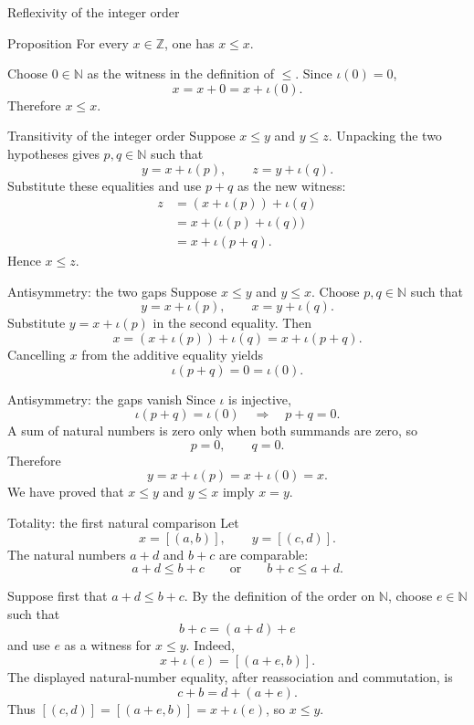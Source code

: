 \documentclass[aspectratio=169,11pt]{beamer}
\newcommand{\N}{\mathbb N}
\newcommand{\Z}{\mathbb Z}
\newcommand{\cl}[2]{\left[(#1,#2)\right]}
\begin{document}
\begin{frame}{Reflexivity of the integer order}
  \begin{block}{Proposition}
    For every \(x\in\Z\), one has \(x\le x\).
  \end{block}

  Choose \(0\in\N\) as the witness in the definition of \(\le\).  Since
  \(\iota(0)=0\),
  \[
    x=x+0=x+\iota(0).
  \]
  Therefore \(x\le x\).
\end{frame}

\begin{frame}{Transitivity of the integer order}
  Suppose \(x\le y\) and \(y\le z\).  Unpacking the two hypotheses gives
  \(p,q\in\N\) such that
  \[
    y=x+\iota(p),
    \qquad
    z=y+\iota(q).
  \]
  Substitute these equalities and use \(p+q\) as the new witness:
  \begin{align*}
    z
      &=(x+\iota(p))+\iota(q)\\
      &=x+\bigl(\iota(p)+\iota(q)\bigr)\\
      &=x+\iota(p+q).
  \end{align*}
  Hence \(x\le z\).
\end{frame}

\begin{frame}{Antisymmetry: the two gaps}
  Suppose \(x\le y\) and \(y\le x\).  Choose \(p,q\in\N\) such that
  \[
    y=x+\iota(p),
    \qquad
    x=y+\iota(q).
  \]
  Substitute \(y=x+\iota(p)\) in the second equality.  Then
  \[
    x=(x+\iota(p))+\iota(q)=x+\iota(p+q).
  \]
  Cancelling \(x\) from the additive equality yields
  \[
    \iota(p+q)=0=\iota(0).
  \]
\end{frame}

\begin{frame}{Antisymmetry: the gaps vanish}
  Since \(\iota\) is injective,
  \[
    \iota(p+q)=\iota(0)
    \quad\Longrightarrow\quad
    p+q=0.
  \]
  A sum of natural numbers is zero only when both summands are zero, so
  \[
    p=0,\qquad q=0.
  \]
  Therefore
  \[
    y=x+\iota(p)=x+\iota(0)=x.
  \]
  We have proved that \(x\le y\) and \(y\le x\) imply \(x=y\).
\end{frame}

\begin{frame}{Totality: the first natural comparison}
  \small
  Let
  \[
    x=\cl{a}{b},
    \qquad
    y=\cl{c}{d}.
  \]
  The natural numbers \(a+d\) and \(b+c\) are comparable:
  \[
    a+d\le b+c
    \qquad\text{or}\qquad
    b+c\le a+d.
  \]

  Suppose first that \(a+d\le b+c\).  By the definition of the order on
  \(\N\), choose \(e\in\N\) such that
  \[
    b+c=(a+d)+e
  \]
  and use \(e\) as a witness for \(x\le y\).  Indeed,
  \[
    x+\iota(e)=\cl{a+e}{b}.
  \]
  The displayed natural-number equality, after reassociation and
  commutation, is
  \[
    c+b=d+(a+e).
  \]
  Thus \(\cl{c}{d}=\cl{a+e}{b}=x+\iota(e)\), so \(x\le y\).
\end{frame}
\end{document}
